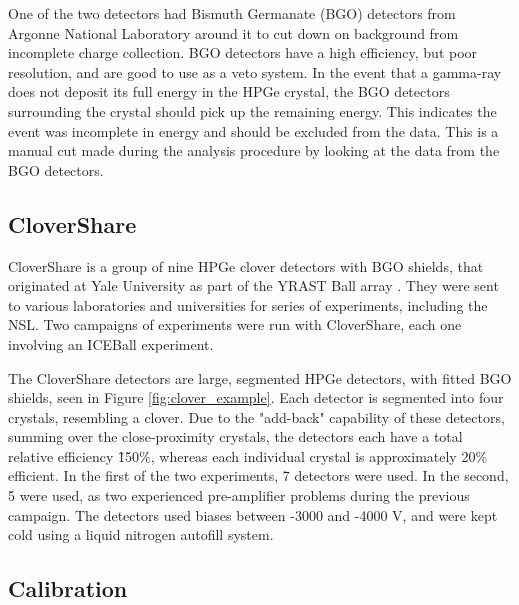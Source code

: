 

One of the two detectors had Bismuth Germanate (BGO) detectors from Argonne National Laboratory around it to cut down on background from incomplete charge collection. BGO detectors have a high efficiency, but poor resolution, and are good to use as a veto system. In the event that a gamma-ray does not deposit its full energy in the HPGe crystal, the BGO detectors surrounding the crystal should pick up the remaining energy. This indicates the event was incomplete in energy and should be excluded from the data. This is a manual cut made during the analysis procedure by looking at the data from the BGO detectors.

\subsection{CloverShare}

CloverShare is a group of nine HPGe clover detectors with BGO shields, that originated at Yale University as part of the YRAST Ball array \citep{beausang00:_yrast}. They were sent to various laboratories and universities for series of experiments, including the NSL. Two campaigns of experiments were run with CloverShare, each one involving an ICEBall experiment.

The CloverShare detectors are large, segmented HPGe detectors, with fitted BGO shields, seen in Figure \ref{fig:clover_example}. Each detector is segmented into four crystals, resembling a clover. Due to the "add-back" capability of these detectors, summing over the close-proximity crystals, the detectors each have a total relative efficiency \~150\%, whereas each individual crystal is approximately 20\% efficient. In the first of the two experiments, 7 detectors were used. In the second, 5 were used, as two experienced pre-amplifier problems during the previous campaign. The detectors used biases between -3000 and -4000 V, and were kept cold using a liquid nitrogen autofill system.



\subsection{Calibration}
\label{sec:clover_cal}

